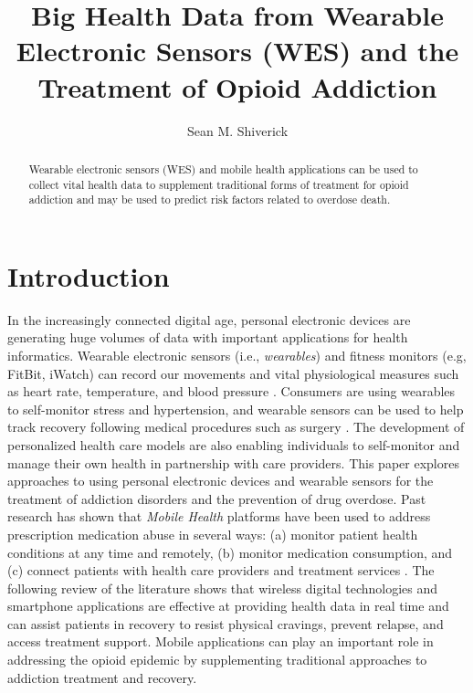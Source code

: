 \documentclass[sigconf]{acmart}
\begin{document}
\title{Big Health Data from Wearable Electronic Sensors (WES) and 
the Treatment of Opioid Addiction}

\author{Sean M. Shiverick}


\begin{abstract}
Wearable electronic sensors (WES) and mobile health applications can be used to
collect vital health data to supplement traditional forms of treatment for opioid
addiction and may be used to predict risk factors related to overdose death. 
\end{abstract}


\maketitle


\section{Introduction}

In the increasingly connected digital age, personal electronic devices are 
generating huge volumes of data with important applications for health 
informatics. Wearable electronic sensors (i.e., \emph{wearables}) and fitness 
monitors (e.g, FitBit, iWatch) can record our movements and vital physiological 
measures such as heart rate, temperature, and blood pressure \cite{metcalf16}. 
Consumers are using wearables to self-monitor stress and hypertension, and 
wearable sensors can be used to help track recovery following medical procedures 
such as surgery \cite{atallah11}. The development of personalized health care 
models are also enabling individuals to self-monitor and manage their own health 
in partnership with care providers. This paper explores approaches to using 
personal electronic devices and wearable sensors for the treatment of addiction 
disorders and the prevention of drug overdose. Past research has shown that 
\emph{Mobile Health} platforms have been used to address prescription medication 
abuse in several ways: (a) monitor patient health conditions at any time and 
remotely, (b) monitor medication consumption, and (c) connect patients with 
health care providers and treatment services \cite{Varshney14}. The following 
review of the literature shows that wireless digital technologies and smartphone
applications are effective at providing health data in real time and can assist 
patients in recovery to resist physical cravings, prevent relapse, and access 
treatment support. Mobile applications can play an important role in addressing 
the opioid epidemic by supplementing traditional approaches to addiction treatment 
and recovery. 
\end{document}

